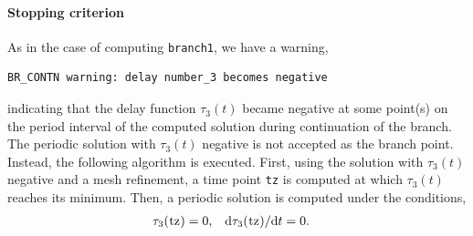 \documentclass[10pt]{scrartcl}
\renewcommand{\d}{\mathrm{d}}
\newcommand{\blist}[1]{\mbox{\lstinline!#1!}}
\begin{document}
\paragraph{Stopping criterion}
As in the case of computing \blist{branch1}, we have a warning,
{\small
\begin{verbatim}
BR_CONTN warning: delay number_3 becomes negative
\end{verbatim}}
\noindent
indicating that the delay function $\tau_3(t)$ became negative at some
point(s) on the period interval of the computed solution during
continuation of the branch.  The periodic solution with $\tau_3(t)$
negative is not accepted as the branch point.  Instead, the following
algorithm is executed. First, using the solution with $\tau_3(t)$
negative and a mesh refinement, a time point \blist{tz} is computed
at which $\tau_3(t)$ reaches its minimum.  Then, a periodic solution
is computed under the conditions,
\begin{align}\label{tz_cond}
\tau_3(\blist{tz})&=0\mbox{,}&{\d}\tau_3(\blist{tz})/{\d}t&=0\mbox{.}
\end{align}
\end{document}
